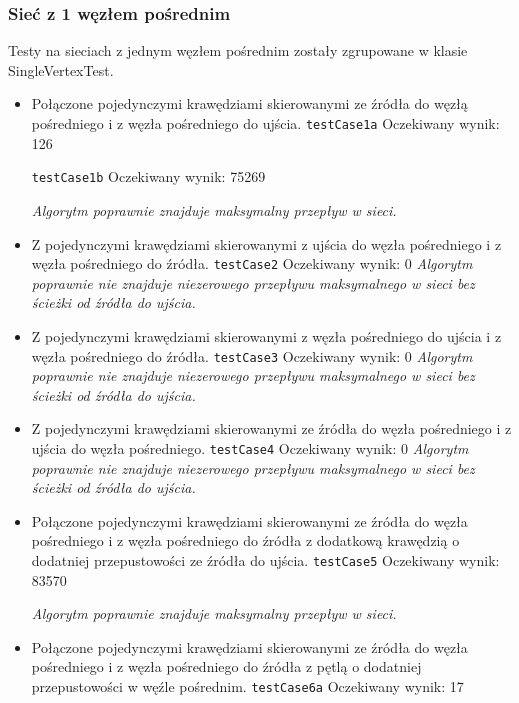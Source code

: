 \subsubsection{Sieć z 1 węzłem pośrednim}
Testy na sieciach z jednym węzłem pośrednim zostały zgrupowane
w klasie SingleVertexTest.
\begin{itemize}[nosep]
    \item Połączone pojedynczymi krawędziami skierowanymi ze źródła do węzłą
    pośredniego i z węzła pośredniego do ujścia.
    \texttt{testCase1a}
    Oczekiwany wynik: 126

    \texttt{testCase1b}
    Oczekiwany wynik: 75269

    \emph{Algorytm poprawnie znajduje maksymalny przepływ w sieci.}

    \item Z pojedynczymi krawędziami skierowanymi z ujścia do węzła pośredniego
    i z węzła pośredniego do źródła.
    \texttt{testCase2}
    Oczekiwany wynik: 0
    \emph{Algorytm poprawnie nie znajduje niezerowego przepływu maksymalnego w sieci bez ścieżki od źródła do ujścia.}

    \item Z pojedynczymi krawędziami skierowanymi z węzła pośredniego do ujścia
    i z węzła pośredniego do źródła.
    \texttt{testCase3}
    Oczekiwany wynik: 0
    \emph{Algorytm poprawnie nie znajduje niezerowego przepływu maksymalnego w sieci bez ścieżki od źródła do ujścia.}

    \item Z pojedynczymi krawędziami skierowanymi ze źródła do węzła pośredniego
    i z ujścia do węzła pośredniego.
    \texttt{testCase4}
    Oczekiwany wynik: 0
    \emph{Algorytm poprawnie nie znajduje niezerowego przepływu maksymalnego w sieci bez ścieżki od źródła do ujścia.}

    \item Połączone pojedynczymi krawędziami skierowanymi ze źródła do węzła
    pośredniego i z węzła pośredniego do źródła z dodatkową krawędzią o
    dodatniej przepustowości ze źródła do ujścia.
    \texttt{testCase5}
    Oczekiwany wynik: 83570

    \emph{Algorytm poprawnie znajduje maksymalny przepływ w sieci.}

    \item Połączone pojedynczymi krawędziami skierowanymi ze źródła do węzła
    pośredniego i z węzła pośredniego do źródła z pętlą o dodatniej
    przepustowości w węźle pośrednim.
    \texttt{testCase6a}
    Oczekiwany wynik: 17


\end{itemize}
